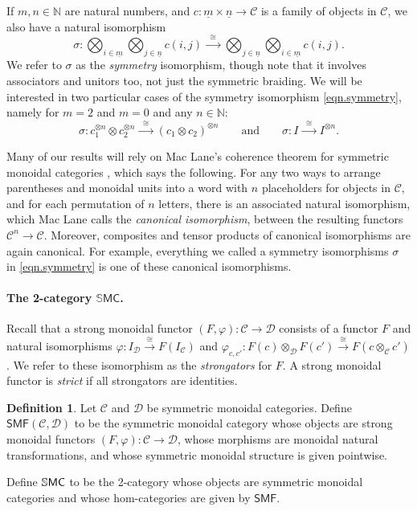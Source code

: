 \documentclass[11pt, oneside, article]{memoir}
\theoremstyle{plain}
\theoremstyle{definition}
\newtheorem{definition}[theorem]{Definition}
\theoremstyle{remark}
\newcommand{\ord}[1]{\underline{#1}}%
\newcommand{\cat}[1]{\mathcal{#1}}%
\newcommand{\Cat}[1]{{\mathsf{#1}}}%
\newcommand{\CCat}[1]{\mathbb{\StrLeft{#1}{1}}\Cat{\StrGobbleLeft{#1}{1}}}%
\newcommand{\tpow}[1]{^{\otimes #1}}
\newcommand{\smf}{\Cat{SMF}}
\newcommand{\ssmc}{\CCat{SMC}}
\newcommand{\nn}{\mathbb{N}}
\newcommand{\To}[1]{\xrightarrow{#1}}
\newcommand{\Too}[1]{\To{\;\;#1\;\;}}
\newcommand{\qqand}{\qquad\text{and}\qquad}
\begin{document}
If $m,n\in\nn$ are natural numbers, and $c\colon \ord{m}\times \ord{n}\to\cat{C}$ is a family of objects in $\cat{C}$, we also have a natural isomorphism
\begin{equation}\label{eqn.symmetry}
\sigma\colon
\bigotimes_{i\in\ord{m}}\bigotimes_{j\in\ord{n}}c(i,j)\Too{\cong}
\bigotimes_{j\in\ord{n}}\bigotimes_{i\in\ord{m}}c(i,j).
\end{equation}
We refer to $\sigma$ as the \emph{symmetry} isomorphism, though note that it involves associators and unitors too, not just the symmetric braiding. We will be interested in two particular cases of the symmetry isomorphism \cref{eqn.symmetry}, namely for $m=2$ and $m=0$ and any $n\in\nn$:
\[\sigma\colon c_1\tpow{n}\otimes c_2\tpow{n}\Too{\cong}(c_1\otimes c_2)\tpow{n}
\qqand
\sigma\colon I\Too{\cong} I\tpow{n}.
\]

Many of our results will rely on Mac Lane's coherence theorem for symmetric monoidal categories \cite[Theorem XI.1]{MacLane:1998a}, which says the following. For any two ways to arrange parentheses and monoidal units into a word with $n$ placeholders for objects in $\cat{C}$, and for each permutation of $n$ letters, there is an associated natural isomorphism, which Mac Lane calls the \emph{canonical isomorphism}, between the resulting functors $\cat{C}^n\to\cat{C}$. Moreover, composites and tensor products of canonical isomorphisms are again canonical. For example, everything we called a symmetry isomorphisms $\sigma$ in \cref{eqn.symmetry} is one of these canonical isomorphisms.


\paragraph{The 2-category $\mathbb{S}\Cat{MC}$.}
Recall that a strong monoidal functor $(F,\varphi)\colon\cat{C}\to\cat{D}$ consists of a functor $F$ and natural isomorphisms $\varphi\colon I_{\cat{D}}\To{\cong} F(I_{\cat{C}})$ and $\varphi_{c,c'}\colon F(c)\otimes_{\cat{D}} F(c')\To{\cong} F(c\otimes_{\cat{C}} c')$. We refer to these isomorphism as the \emph{strongators} for $F$. A strong monoidal functor is \emph{strict} if all strongators are identities.

\begin{definition}\label{def.smf}
Let $\cat{C}$ and $\cat{D}$ be symmetric monoidal categories. Define $\smf(\cat{C},\cat{D})$ to be the symmetric monoidal category whose objects are strong monoidal functors $(F,\varphi)\colon\cat{C}\to\cat{D}$, whose morphisms are monoidal natural transformations, and whose symmetric monoidal structure is given pointwise.

Define $\ssmc$ to be the 2-category whose objects are symmetric monoidal categories and whose hom-categories are given by $\smf$.
\end{definition}
\end{document}

